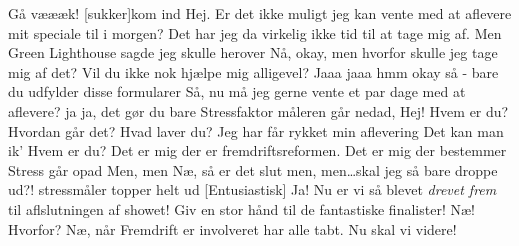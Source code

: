 \documentclass[a4paper,11pt]{article}
\begin{document}
\begin{sketch}
 Gå væææk! 
[sukker]kom ind
 Hej. Er det ikke muligt jeg kan vente med at aflevere mit speciale til i morgen?
 Det har jeg da virkelig ikke tid til at tage mig af. 
 Men Green Lighthouse sagde jeg skulle herover
 Nå, okay, men hvorfor skulle jeg tage mig af det?
 Vil du ikke nok hjælpe mig alligevel?
 Jaaa jaaa hmm okay så - bare du udfylder disse formularer
 Så, nu må jeg gerne vente et par dage med at aflevere?
 ja ja, det gør du bare
 Stressfaktor måleren går nedad, 
 Hej!
 Hvem er du?
 Hvordan går det? Hvad laver du?
 Jeg har får rykket min aflevering 
 Det kan man ik’
 Hvem er du?
 Det er mig der er fremdriftsreformen. Det er mig der bestemmer
 Stress går opad
 Men, men
Næ, så er det slut
 men, men\ldots skal jeg så bare droppe ud?!
 stressmåler topper helt ud
[Entusiastisk] Ja!
 Nu er vi så blevet \emph{drevet frem} til aflslutningen af showet! Giv en stor hånd til de fantastiske finalister!
 Næ!
 Hvorfor?
 Næ, når Fremdrift er involveret har alle tabt. Nu skal vi videre!
\end{sketch}
\end{document}
